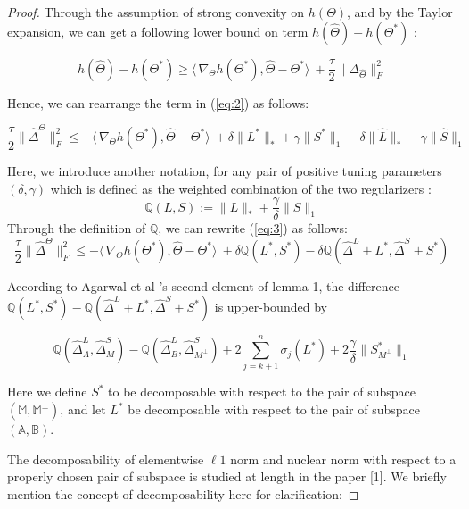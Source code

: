\documentclass{article}
\begin{document}
\begin{proof}
Through the assumption of strong convexity on $h(\Theta)$, and by the Taylor expansion, we can get a following lower bound on term $h(\hat{\Theta})-h(\Theta^{*})$ :

\[
h(\hat{\Theta})-h(\Theta^{*}) \geq 
\langle\, \nabla_{\Theta}h(\Theta^{*}),\hat{\Theta}-\Theta^{*}\rangle\
+ \frac{\tau}{2}\|\Delta_{\hat{\Theta}}\|_{F}^{2}
\]

Hence, we can rearrange the term in (\ref{eq:2}) as follows:

\begin{equation}\label{eq:3}
    \frac{\tau}{2}\|\hat{\Delta}^{\Theta}\|_{F}^{2} \leq 
    -\langle\,\nabla_{\Theta}h(\Theta^{*}),\hat{\Theta}-\Theta^{*}\rangle\
    + \delta \|L^{*}\|_\ast + \gamma \|S^{*}\|_1 
    - \delta \|\hat{L}\|_\ast - \gamma \|\hat{S}\|_1
\end{equation}

Here, we introduce another notation, for any pair of positive tuning parameters $(\delta,\gamma)$ which is defined as the weighted combination of the two regularizers : 
\[
\mathbb{Q}(L,S)   := \|L\|_{*} + \frac{\gamma}{\delta}\|S\|_1
\]
Through the definition of $\mathbb{Q}$, we can rewrite (\ref{eq:3}) as follows:
\begin{equation}\label{eq:4}
    \frac{\tau}{2}\|\hat{\Delta}^{\Theta}\|_{F}^{2} \leq 
    -\langle\,\nabla_{\Theta}h(\Theta^{*}),\hat{\Theta}-\Theta^{*}\rangle\
    + \delta \mathbb{Q}(L^{*},S^{*}) - \delta \mathbb{Q}(\hat{\Delta}^L + L^{*},\hat{\Delta}^S + S^{*})
\end{equation}

According to Agarwal et al \cite{agarwal2012noisy}'s second element of lemma 1, 
the difference $\mathbb{Q}(L^*,S^*)- \mathbb{Q}(\hat{\Delta}^L + L^{*},\hat{\Delta}^S + S^{*})$ is upper-bounded by 

\begin{equation}\label{eq:5}
    \mathbb{Q}(\hat{\Delta}^L_{A},\hat{\Delta}^S_{M}) - \mathbb{Q}(\hat{\Delta}^L_{B},\hat{\Delta}^S_{M^\perp})
    +2 \sum_{j=k+1}^{n} \sigma_{j}(L^*) + 2\frac{\gamma}{\delta}\|S^*_{M^\perp}\|_{1}
\end{equation}

Here we define $S^{*}$ to be decomposable with respect to the pair of subspace $(\mathbb{M},\mathbb{M}^{\perp})$, and let $L^{*}$ be decomposable with respect to the pair of subspace $(\mathbb{A},\mathbb{B})$. 

The decomposability of elementwise $\ell 1$ norm and nuclear norm with respect to a properly chosen pair of subspace is studied at length in the paper [1]. We briefly mention the concept of decomposability here for clarification:


\end{proof}
\end{document}
